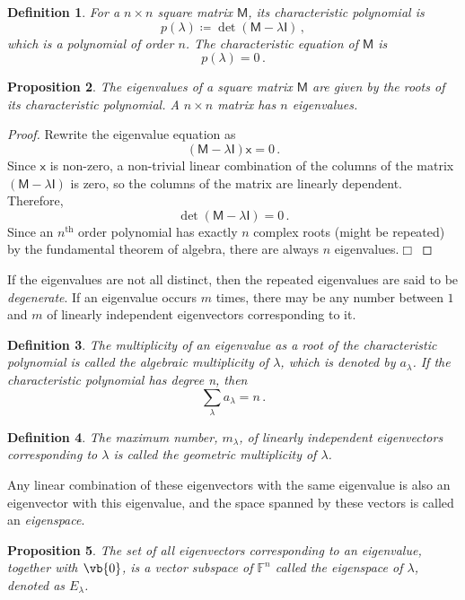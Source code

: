 \documentclass{article}
\theoremstyle{plain}\theoremheaderfont{\normalfont\itshape}\theorembodyfont{\rmfamily}\theoremseparator{.}\newtheorem*{rem}{Remark}\newtheorem*{ex}{Example}\newtheorem*{proof}{Proof}\newtheorem*{altp}{Alternative proof}
\theoremstyle{plain}\theoremheaderfont{\normalfont\bfseries}\theorembodyfont{\rmfamily}\theoremseparator{.}\newtheorem{thm}{Theorem}[section]\newtheorem{lem}[thm]{Lemma}\newtheorem{prop}[thm]{Proposition}\newtheorem*{cor}{Corollary}\newtheorem{defn}[thm]{Definition}\newtheorem{clm}[thm]{Claim}\newtheorem{clminproof}{Claim}
\theoremstyle{break}\theoremheaderfont{\normalfont\itshape}\theorembodyfont{\rmfamily}\theoremseparator{.\medskip}\newtheorem*{proofskip}{Proof}\newtheorem*{exs}{Examples}\newtheorem*{rems}{Remarks}
\theoremstyle{break}\theoremheaderfont{\normalfont\bfseries}\theorembodyfont{\rmfamily}\theoremseparator{.\medskip}\newtheorem{lemskip}[thm]{Lemma}\newtheorem{defnskip}[thm]{Definition}\newtheorem{propskip}[thm]{Proposition}\newtheorem{thmskip}[thm]{Theorem}
\numberwithin{equation}{section}
\newcommand{\qed}{\hfill\ensuremath{\Box}}
\begin{document}
	\begin{defn}
		For a \(n\times n\) square matrix \(\mathsf{M}\), its \textit{characteristic polynomial} is
		\[p(\lambda)\coloneqq\det(\mathsf{M}-\lambda\mathsf{I})\,,\]
		which is a polynomial of order \(n\). The \textit{characteristic equation} of \(\mathsf{M}\) is
		\[p(\lambda)=0\,.\]
	\end{defn}
	\begin{prop}
		The eigenvalues of a square matrix \(\mathsf{M}\) are given by the roots of its characteristic polynomial. A \(n\times n\) matrix has \(n\) eigenvalues.
	\end{prop}
	\begin{proof}
		Rewrite the eigenvalue equation as
		\[(\mathsf{M}-\lambda\mathsf{I})\mathsf{x}=0\,.\]
		Since \(\mathsf{x}\) is non-zero, a non-trivial linear combination of the columns of the matrix \((\mathsf{M}-\lambda\mathsf{I})\) is zero, so the columns of the matrix are linearly dependent. Therefore,
		\[\det(\mathsf{M}-\lambda\mathsf{I})=0\,.\]
		Since an \(n^{\text{th}}\) order polynomial has exactly \(n\) complex roots (might be repeated) by the fundamental theorem of algebra, there are always \(n\) eigenvalues.\qed
	\end{proof}
	If the eigenvalues are not all distinct, then the repeated eigenvalues are said to be \textit{degenerate}. If an eigenvalue occurs \(m\) times, there may be any number between \(1\) and \(m\) of linearly independent eigenvectors corresponding to it.
	\begin{defn}
		The multiplicity of an eigenvalue as a root of the characteristic polynomial is called the \textit{algebraic multiplicity} of \(\lambda\), which is denoted by \(a_\lambda\). If the characteristic polynomial has degree n, then
		\[\sum_\lambda a_\lambda=n\,.\]
	\end{defn}
	\begin{defn}
		The maximum number, \(m_\lambda\), of linearly independent eigenvectors corresponding to \(\lambda\) is called the \textit{geometric multiplicity} of \(\lambda\).
	\end{defn}
	Any linear combination of these eigenvectors with the same eigenvalue is also an eigenvector with this eigenvalue, and the space spanned by these vectors is called an \textit{eigenspace}.
	\begin{prop}
		The set of all eigenvectors corresponding to an eigenvalue, together with \(\vb{0}\), is a vector subspace of \(\mathbb{F}^n\) called the \textit{eigenspace} of \(\lambda\), denoted as \(E_\lambda\).
	\end{prop}
\end{document}
